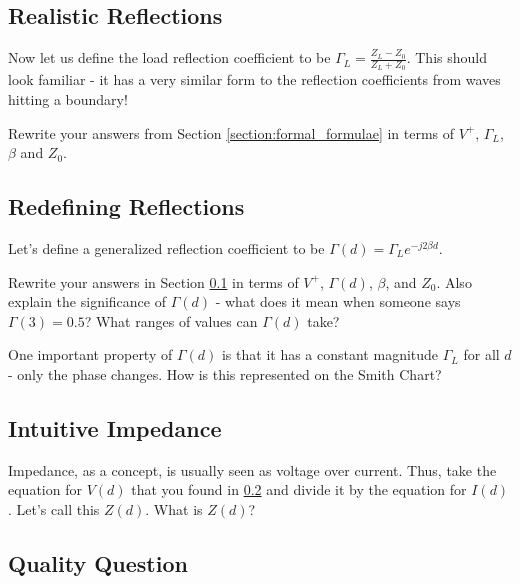 \documentclass{article}
\begin{document}
\vspace{3cm}

\subsection{Realistic Reflections}
\label{section:realistic_reflections}

Now let us define the load reflection coefficient to be $\Gamma_L = \frac{Z_L - Z_0}{Z_L + Z_0}$. This should look familiar - it has a very similar form to the reflection coefficients from waves hitting a boundary!

Rewrite your answers from Section \ref{section:formal_formulae} in terms of $V^+$, $\Gamma_L$, $\beta$ and $Z_0$.

\vspace{3cm}

\subsection{Redefining Reflections}
\label{section:redefining_reflections}

Let's define a generalized reflection coefficient to be $\Gamma(d) = \Gamma_L e^{-j2 \beta d}$.

Rewrite your answers in Section \ref{section:realistic_reflections} in terms of $V^+$, $\Gamma(d)$, $\beta$, and $Z_0$. Also explain the significance of $\Gamma(d)$ - what does it mean when someone says $\Gamma(3) = 0.5$? What ranges of values can $\Gamma(d)$ take?

One important property of $\Gamma(d)$ is that it has a constant magnitude $\Gamma_L$ for all $d$ - only the phase changes. How is this represented on the Smith Chart?

\vspace{3cm}

\subsection{Intuitive Impedance}

Impedance, as a concept, is usually seen as voltage over current. Thus, take the equation for $V(d)$ that you found in \ref{section:redefining_reflections} and divide it by the equation for $I(d)$. Let's call this $Z(d)$. What is $Z(d)$?

\vspace{1cm}

\subsection{Quality Question}
\end{document}
